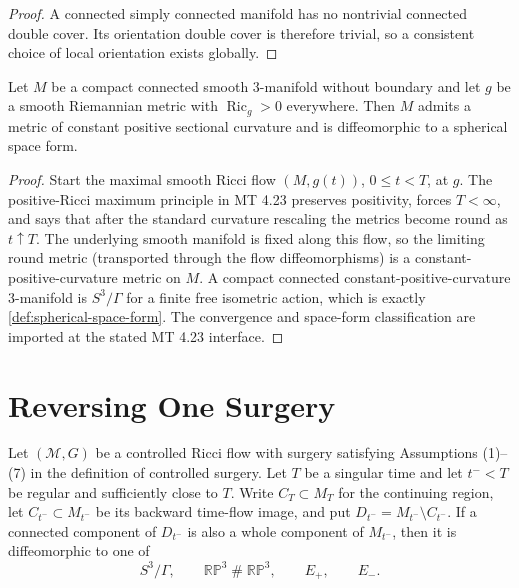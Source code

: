 \begin{proof}
A connected simply connected manifold has no nontrivial connected double
cover.  Its orientation double cover is therefore trivial, so a consistent
choice of local orientation exists globally.
\end{proof}

\begin{theorem}
\label{thm:positive-ricci-three-manifold-roundness}
\notready
Let $M$ be a compact connected smooth $3$-manifold without boundary and let
$g$ be a smooth Riemannian metric with $\operatorname{Ric}_g>0$ everywhere.
Then $M$ admits a metric of constant positive sectional curvature and is
diffeomorphic to a spherical space form.
\end{theorem}

\begin{proof}
Start the maximal smooth Ricci flow $(M,g(t))$, $0\le t<T$, at $g$.  The
positive-Ricci maximum principle in MT 4.23 preserves positivity, forces
$T<\infty$, and says that after the standard curvature rescaling the metrics
become round as $t\uparrow T$.  The underlying smooth manifold is fixed along
this flow, so the limiting round metric (transported through the flow
diffeomorphisms) is a constant-positive-curvature metric on $M$.  A compact
connected constant-positive-curvature $3$-manifold is $S^3/\Gamma$ for a finite
free isometric action, which is exactly
\ref{def:spherical-space-form}.  The convergence and space-form
classification are imported at the stated MT 4.23 interface.
\end{proof}

\section{Reversing One Surgery}

\begin{lemma}
\label{lem:whole-disappearing-component-classification}
\notready
Let $({\mathcal M},G)$ be a controlled Ricci flow with surgery satisfying
Assumptions (1)--(7) in the definition of controlled surgery.  Let $T$ be a
singular time and let $t^-<T$ be regular and sufficiently close to $T$.  Write
$C_T\subset M_T$ for the continuing region, let
$C_{t^-}\subset M_{t^-}$ be its backward time-flow image, and put
$D_{t^-}=M_{t^-}\setminus C_{t^-}$.  If a connected component of $D_{t^-}$ is
also a whole component of $M_{t^-}$, then it is diffeomorphic
to one of
\[
 S^3/\Gamma,\qquad \mathbb{RP}^3\mathbin{\#}\mathbb{RP}^3,
 \qquad E_+,
 \qquad E_-.
\]
\end{lemma}

